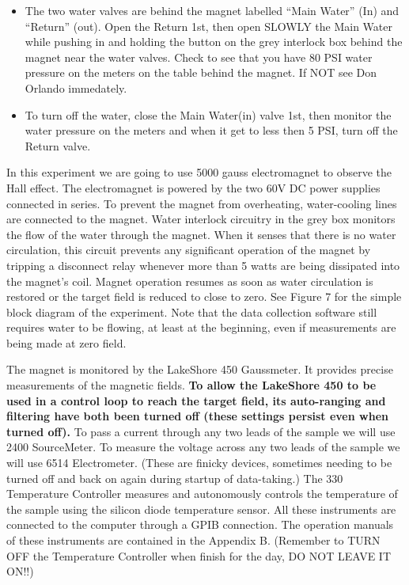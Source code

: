 \documentclass{../lab}
\begin{document}
\begin{itemize}
    \item The two water valves are behind the magnet labelled ``Main Water'' (In) and ``Return'' (out). Open the Return 1st, then open SLOWLY the Main Water while pushing in and holding the button on the grey interlock box behind the magnet near the water valves. Check to see that you have 80 PSI water pressure on the meters on the table behind the magnet. If NOT see Don Orlando immedately.

    \item To turn off the water, close the Main Water(in) valve 1st, then monitor the water pressure on the meters and when it get to less then 5 PSI, turn off the Return valve.
\end{itemize}

In this experiment we are going to use 5000 gauss electromagnet to observe the Hall effect. The electromagnet is powered by the two 60V DC power supplies connected in series. To prevent the magnet from overheating, water-cooling lines are connected to the magnet. Water interlock circuitry in the grey box monitors the flow of the water through the magnet. When it senses that there is no water circulation, this circuit prevents any significant operation of the magnet by tripping a disconnect relay whenever more than 5 watts are being dissipated into the magnet's coil. Magnet operation resumes as soon as water circulation is restored or the target field is reduced to close to zero. See Figure 7 for the simple block diagram of the experiment. Note that the data collection software still requires water to be flowing, at least at the beginning, even if measurements are being made at zero field.

The magnet is monitored by the LakeShore 450 Gaussmeter. It provides precise measurements of the magnetic fields. \textbf{To allow the LakeShore 450 to be used in a control loop to reach the target field, its auto-ranging and filtering have both been turned off (these settings persist even when turned off).} To pass a current through any two leads of the sample we will use 2400 SourceMeter. To measure the voltage across any two leads of the sample we will use 6514 Electrometer. (These are finicky devices, sometimes needing to be turned off and back on again during startup of data-taking.) The 330 Temperature Controller measures and autonomously controls the temperature of the sample using the silicon diode temperature sensor. All these instruments are connected to the computer through a GPIB connection. The operation manuals of these instruments are contained in the Appendix B. (Remember to TURN OFF the Temperature Controller when finish for the day, DO NOT LEAVE IT ON!!)
\end{document}
